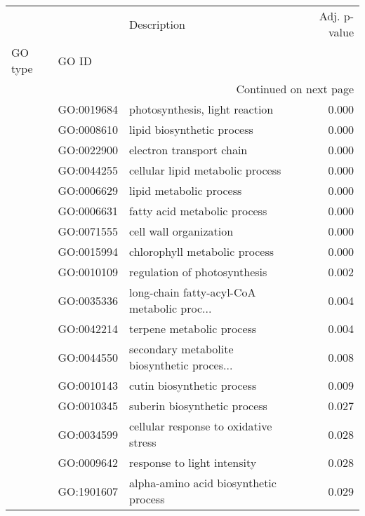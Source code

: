 \begin{longtable}{lllr}
\toprule
   &            &                                  Description &  Adj. p-value \\
GO type & GO ID &                                              &               \\
\midrule
\endhead
\midrule
\multicolumn{4}{r}{{Continued on next page}} \\
\midrule
\endfoot

\bottomrule
\endlastfoot
\multirow{21}{*}{BP} & GO:0019684 &               photosynthesis, light reaction &         0.000 \\
   & GO:0008610 &                   lipid biosynthetic process &         0.000 \\
   & GO:0022900 &                     electron transport chain &         0.000 \\
   & GO:0044255 &             cellular lipid metabolic process &         0.000 \\
   & GO:0006629 &                      lipid metabolic process &         0.000 \\
   & GO:0006631 &                 fatty acid metabolic process &         0.000 \\
   & GO:0071555 &                       cell wall organization &         0.000 \\
   & GO:0015994 &                chlorophyll metabolic process &         0.000 \\
   & GO:0010109 &                 regulation of photosynthesis &         0.002 \\
   & GO:0035336 &  long-chain fatty-acyl-CoA metabolic proc... &         0.004 \\
   & GO:0042214 &                    terpene metabolic process &         0.004 \\
   & GO:0044550 &  secondary metabolite biosynthetic proces... &         0.008 \\
   & GO:0010143 &                   cutin biosynthetic process &         0.009 \\
   & GO:0010345 &                 suberin biosynthetic process &         0.027 \\
   & GO:0034599 &        cellular response to oxidative stress &         0.028 \\
   & GO:0009642 &                  response to light intensity &         0.028 \\
   & GO:1901607 &        alpha-amino acid biosynthetic process &         0.029 \\

\end{longtable}
